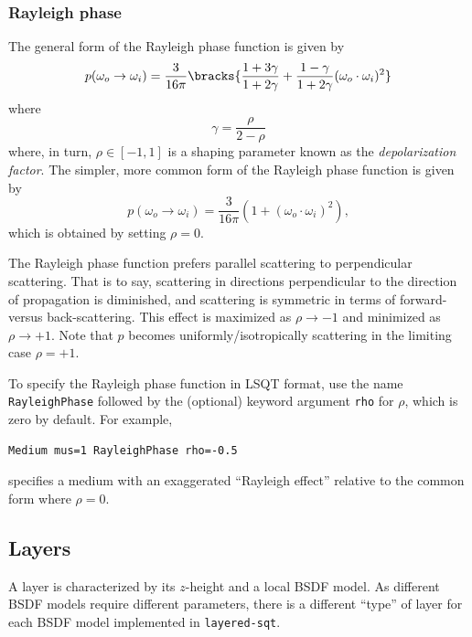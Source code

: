\documentclass[
    twoside,
    twocolumn,
    letterpaper,
    10pt]{article}
\newcommand\namett[2]{{\color{code#1}\texttt{#2}}}
\begin{document}
\subsubsection{Rayleigh phase}
\label{sec:doc-media-rayleigh}

The general form of the Rayleigh phase function is given by
\begin{equation*}
    p(\omega_o\to\omega_i) = 
    \frac{3}{16\pi}
    \bracks{
        \frac{1 + 3\gamma}{1 + 2\gamma} +
        \frac{1 -  \gamma}{1 + 2\gamma} (\omega_o\cdot\omega_i)^2}
\end{equation*}
where
\begin{equation*}
    \gamma = \frac{\rho}{2 - \rho}
\end{equation*}
where, in turn, $\rho \in [-1, 1]$ is a shaping parameter known as 
the \emph{depolarization factor}. The simpler, more common form of the
Rayleigh phase function is given by
\begin{equation*}
    p(\omega_o\to\omega_i) = \frac{3}{16\pi}(1 + (\omega_o\cdot\omega_i)^2),
\end{equation*}
which is obtained by setting $\rho = 0$. 

The Rayleigh phase function prefers parallel scattering
to perpendicular scattering. That is to say, scattering in directions 
perpendicular to the direction of propagation is diminished, and scattering 
is symmetric in terms of forward- versus back-scattering. This effect is 
maximized as $\rho \to -1$ and minimized as $\rho \to +1$. Note that $p$ 
becomes uniformly/isotropically scattering in the limiting case $\rho = +1$.

To specify the Rayleigh phase function in LSQT format, use the name 
\namett{purple}{RayleighPhase} followed by the (optional) keyword argument
\texttt{rho} for $\rho$, which is zero by default. For example,
\begin{lstlisting}
Medium mus=1 RayleighPhase rho=-0.5
\end{lstlisting}
specifies a medium with an exaggerated ``Rayleigh effect'' relative to the
common form where $\rho=0$.

\subsection{Layers}
\label{sec:doc-layers}

A layer is characterized by its $z$-height and 
a local BSDF model. As different BSDF models require different 
parameters, there is a different ``type'' of layer for each 
BSDF model implemented in \texttt{layered-sqt}. 
\end{document}
